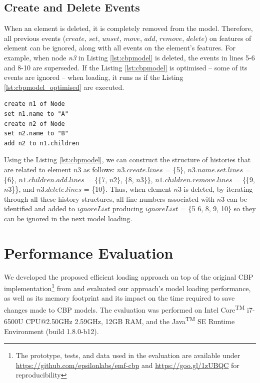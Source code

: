 \documentclass{llncs}
\begin{document}
{    \subsection{Create and Delete Events}
    \label{subsec:create_and_delete_operations}
    
    When an element is deleted, it is completely removed from the model. Therefore, all previous events ($create$, $set$, $unset$, $move$, $add$, $remove$, $delete$) on features of element can be ignored, along with all events on the element's features. For example, when node \emph{n3} in Listing \ref{lst:cbpmodel} is deleted, the events in lines 5-6 and 8-10 are superseded. If the Listing \ref{lst:cbpmodel} is optimised -- some of its events are ignored -- when loading, it runs as if the Listing \ref{lst:cbpmodel_optimised} are executed.
    
    \begin{lstlisting}[style=eol,caption={Change-based representation of the model in Figure \ref{fig:initial_model} after removal of node $n3$.},label=lst:cbpmodel_optimised]
create n1 of Node
set n1.name to "A"
create n2 of Node
set n2.name to "B"
add n2 to n1.children
    \end{lstlisting}
    
    Using the Listing \ref{lst:cbpmodel}, we can construct the structure of histories that are related to element $n3$ as follows: $n3$.$create$.$lines$ = \{5\}, $n3$.$name$.$set$.$lines$ = \{6\}, $n1$.$children$.$add$.$lines$ = \{\{7, $n2$\}, \{8, $n3$\}\}, $n1$.$children$.$remove$.$lines$ = \{\{9, $n3$\}\}, and $n3$.$delete$.$lines$ = \{10\}. Thus, when element $n3$ is deleted, by iterating through all these history structures, all line numbers associated with $n3$ can be identified and added to $ignoreList$ producing $ignoreList$ = \{5 6, 8, 9, 10\} so they can be ignored in the next model loading.
    
    \section{Performance Evaluation}
    \label{sec:performance_evaluation}
    
    We developed the proposed efficient loading approach on top of the original CBP implementation\footnote{The prototype, tests, and data used in the evaluation are available under \url{https://github.com/epsilonlabs/emf-cbp} and \url{https://goo.gl/1zUBQC} for reproducibility} from \cite{yohannis2017turning} and evaluated our approach's model loading performance, as well as its memory footprint and its impact on the time required to save changes made to CBP models. The evaluation was performed on Intel\textsuperscript{\textregistered} Core\textsuperscript{TM} i7-6500U CPU@2.50GHz 2.59GHz, 12GB RAM, and the Java\textsuperscript{TM} SE Runtime Environment (build 1.8.0-b12).
    
}
\end{document}
